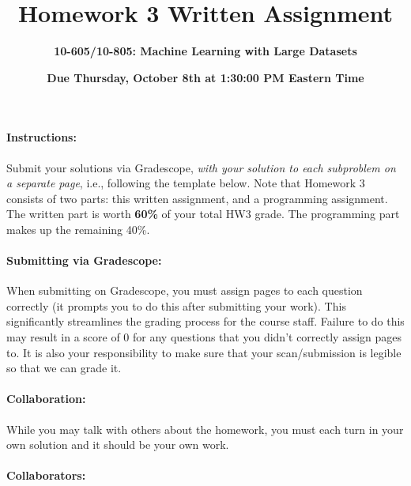 \documentclass{exam}
\newcommand{\grade}[1]{\small\textcolor{magenta}{\emph{[#1 points]}} \normalsize}
\begin{document}
\title{Homework 3 Written Assignment}
\author{\Large \bf 10-605/10-805: Machine Learning with Large Datasets}
\date{{\bf Due Thursday, October 8th at 1:30:00 PM Eastern Time}}
\maketitle

\paragraph{Instructions:} Submit your solutions via Gradescope, \textit{with your solution to each subproblem on a separate page}, i.e., following the template below.  Note that Homework 3 consists of two parts: this written assignment, and a programming assignment. The written part is worth \textbf{60\%} of your total HW3 grade. The programming part makes up the remaining 40\%.

\paragraph{Submitting via Gradescope:} When submitting on Gradescope, you must assign pages to each question correctly (it
prompts you to do this after submitting your work). This significantly streamlines the
grading process for the course staff.  Failure to do this may result in a score of 0 for any questions
that you didn't correctly assign pages to. It is also your responsibility to make sure that your scan/submission is legible so that we can grade it.

\paragraph{Collaboration:}  While you may talk with others about the homework, you must each turn in your own solution and it should be your own work. 

\paragraph{Collaborators:}


\newpage


    
\end{document}
